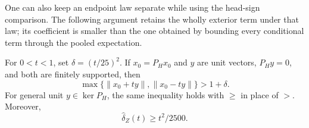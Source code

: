 One can also keep an endpoint law separate while using the head-sign
comparison. The following argument retains the wholly exterior term
under that law; its coefficient is smaller than the one obtained by
bounding every conditional term through the pooled expectation.

\begin{proposition}\label{stab:coef:conditional-modulus}
For $0<t<1$, set $\delta=(t/25)^2$. If $x_0=P_Hx_0$ and $y$
are unit vectors, $P_Hy=0$, and both are finitely supported, then
\begin{equation}\label{stab:coef:finite-strict}
 \max\{\|x_0+ty\|,\|x_0-ty\|\}>1+\delta.
\end{equation}
For general unit $y\in\ker P_H$, the same inequality holds with
$\ge$ in place of $>$. Moreover,
\begin{equation}\label{stab:coef:conditional-modulus-eq}
 \widehat\delta_Z(t)\ge t^2/2500.
\end{equation}
\end{proposition}

